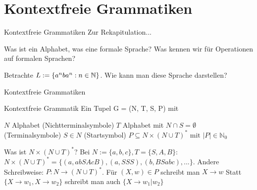 \def\tutdate{8.12.2016}


\section{Kontextfreie Grammatiken}
\begin{frame}{Kontextfreie Grammatiken}
	\ip Zur Rekapitulation...
	
	\begin{itemize}
		\pitem Was ist ein Alphabet, was eine formale Sprache?
		\pitem Was kennen wir für Operationen auf formalen Sprachen?
	\end{itemize}

	\bp 
	
	Betrachte $L := \{a^nba^n : n \in \mathbb{N} \}$. \ip Wie kann man diese Sprache darstellen?
\end{frame}

\begin{frame}{Kontextfreie Grammatiken}
	\begin{block}{Kontextfreie Grammatik}
		Ein Tupel G = (N, T, S, P) mit
		\begin{itemize}
			\pitem $N$ Alphabet (Nichtterminalsymbole)
			\pitem $T$ Alphabet mit $N \cap S = \emptyset$ (Terminalsymbole)
			\pitem $S \in N$ (Startsymbol)
			\pitem $P \subseteq N \times (N \cup T)^* \text{ mit } |P| \in \mathbb{N}_0$
		\end{itemize}
	\end{block}

	\begin{itemize}
		\pitem Was ist $N \times (N \cup T)^*$? \pause Bei $N := \{a,b,c\}, T = \{S, A, B\}$\ip : $N \times (N \cup T)^* = \{(a, abSAcB), (a, SSS), (b, BSabc), ...\}$.
		\pitem Andere Schreibweise: $P : N \rightarrow (N \cup T)^*$.
		\pitem Für $(X, w) \in P$ schreibt man $X \rightarrow w$
		\pitem Statt $\{X\rightarrow w_1, X \rightarrow w_2 \}$ schreibt man auch $\{X \rightarrow w_1 | w_2\}$
	\end{itemize}
	
\end{frame}

